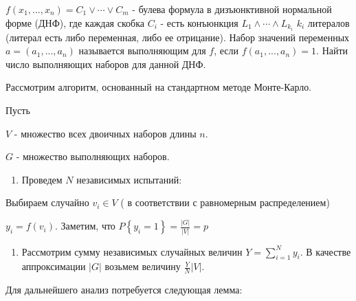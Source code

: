 \begin{problem}

$f(x_{1} ,...,x_{n} )=C_{1} \vee \cdots \vee C_{m} $ - булева формула в дизъюнктивной нормальной форме (ДНФ), где каждая скобка $C_{i} $ - есть конъюнкция $L_{1} \wedge \cdots \wedge L_{k_{i} } $ $k_{i} $ литералов (литерал есть либо переменная, либо ее отрицание). Набор значений переменных $a=(a_{1} ,...,a_{n} )$ называется выполняющим для $f$, если $f(a_{1} ,...,a_{n} )=1$. Найти число выполняющих наборов для данной ДНФ.

\noindent 

\noindent Рассмотрим алгоритм, основанный на стандартном методе Монте-Карло.

\noindent Пусть 

\noindent $V$ - множество всех двоичных наборов длины $n$.

\noindent $G$ - множество выполняющих наборов.

\begin{enumerate}
\item  Проведем $N$ независимых испытаний:
\end{enumerate}

\noindent Выбираем случайно $v_{i} \in V$ ( в соответствии с равномерным распределением)

\noindent $y_{i} =f(v_{i} )$. Заметим, что $P\left\{y_{i} =1\right\}=\frac{\left|G\right|}{\left|V\right|} =p$

\begin{enumerate}
\item  Рассмотрим сумму независимых случайных величин $Y=\sum _{i=1}^{N}y_{i}  $. В качестве аппроксимации $\left|G\right|$ возьмем величину $\frac{Y}{N} \left|V\right|$.
\end{enumerate}

\noindent Для дальнейшего анализ потребуется следующая лемма:


\end{problem}
